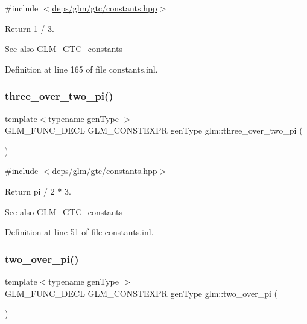 {\ttfamily \#include $<$\hyperlink{constants_8hpp}{deps/glm/gtc/constants.\+hpp}$>$}

Return 1 / 3. \begin{DoxySeeAlso}{See also}
\hyperlink{group__gtc__constants}{G\+L\+M\+\_\+\+G\+T\+C\+\_\+constants} 
\end{DoxySeeAlso}


Definition at line 165 of file constants.\+inl.

\mbox{\label{group__gtc__constants_gae94950df74b0ce382b1fc1d978ef7394}} 
\subsubsection{\texorpdfstring{three\+\_\+over\+\_\+two\+\_\+pi()}{three\_over\_two\_pi()}}
{\footnotesize\ttfamily template$<$typename gen\+Type $>$ \\
G\+L\+M\+\_\+\+F\+U\+N\+C\+\_\+\+D\+E\+CL G\+L\+M\+\_\+\+C\+O\+N\+S\+T\+E\+X\+PR gen\+Type glm\+::three\+\_\+over\+\_\+two\+\_\+pi (\begin{DoxyParamCaption}{ }\end{DoxyParamCaption})}



{\ttfamily \#include $<$\hyperlink{constants_8hpp}{deps/glm/gtc/constants.\+hpp}$>$}

Return pi / 2 $\ast$ 3. \begin{DoxySeeAlso}{See also}
\hyperlink{group__gtc__constants}{G\+L\+M\+\_\+\+G\+T\+C\+\_\+constants} 
\end{DoxySeeAlso}


Definition at line 51 of file constants.\+inl.

\mbox{\label{group__gtc__constants_ga74eadc8a211253079683219a3ea0462a}} 
\subsubsection{\texorpdfstring{two\+\_\+over\+\_\+pi()}{two\_over\_pi()}}
{\footnotesize\ttfamily template$<$typename gen\+Type $>$ \\
G\+L\+M\+\_\+\+F\+U\+N\+C\+\_\+\+D\+E\+CL G\+L\+M\+\_\+\+C\+O\+N\+S\+T\+E\+X\+PR gen\+Type glm\+::two\+\_\+over\+\_\+pi (\begin{DoxyParamCaption}{ }\end{DoxyParamCaption})}



